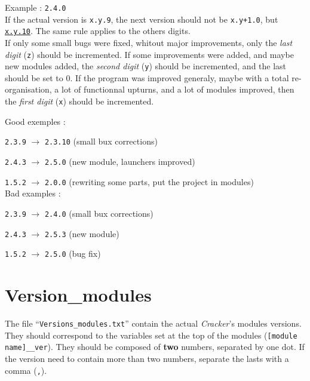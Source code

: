 \documentclass[a4paper,10pt]{report}
\begin{document}
   \noindent Example : \texttt{2.4.0} \\
   
   If the actual version is \texttt{x.y.9}, the next version should not be \texttt{x.y+1.0}, but \underline{\texttt{x.y.10}}. The same rule applies to the others digits. \\
   
   If only some small bugs were fixed, whitout major improvements, only the \emph{last digit} (\texttt{z}) should be incremented. If some improvements were added, and maybe new modules added, the \emph{second digit} (\texttt{y}) should be incremented, and the last should be set to 0. If the program was improved generaly, maybe with a total re-organisation, a lot of functionnal upturns, and a lot of modules improved, then the \emph{first digit} (\texttt{x}) should be incremented. \newline \newline
   
   
   \noindent Good exemples :
   
   \texttt{2.3.9} $\rightarrow$ \texttt{2.3.10} (small bux corrections)
   
   \texttt{2.4.3} $\rightarrow$ \texttt{2.5.0} (new module, launchers improved)
   
   \texttt{1.5.2} $\rightarrow$ \texttt{2.0.0} (rewriting some parts, put the project in modules) \\
   
   
   \noindent Bad examples :
   
   \texttt{2.3.9} $\rightarrow$ \texttt{2.4.0} (small bux corrections)
   
   \texttt{2.4.3} $\rightarrow$ \texttt{2.5.3} (new module)
   
   \texttt{1.5.2} $\rightarrow$ \texttt{2.5.0} (bug fix)
  
   
  \section{Version\_modules}
   The file ``\texttt{Versions\_modules.txt}'' contain the actual \emph{Cracker}'s modules versions. They should correspond to the variables set at the top of the modules (\texttt{[module name]\_\_ver}). They should be composed of \textbf{two} numbers, separated by one dot. If the version need to contain more than two numbers, separate the lasts with a comma (\texttt{,}). \\
   
\end{document}
